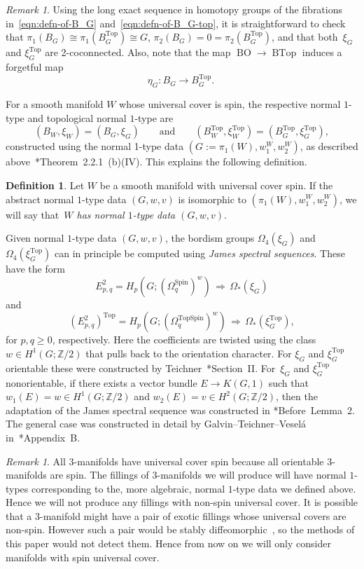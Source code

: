 \documentclass[a4paper, reqno]{amsart}
\theoremstyle{definition}
\newtheorem{definition}[proposition]{Definition}
\theoremstyle{remark}
\newtheorem{remark}[proposition]{Remark}
\renewcommand{\top}{\mathrm{Top}}
\newcommand{\Z}{\mathbb{Z}}
\newcommand{\Spin}{\mathrm{Spin}}
\DeclareMathOperator{\TopSpin}{TopSpin}
\DeclareMathOperator{\BTop}{BTop}
\newcommand{\Top}{\mathrm{Top}}
\DeclareMathOperator{\BO}{BO}
\begin{document}
\begin{remark}\label{remark:les-homotopy-groups}
       Using the long exact sequence in homotopy groups of the fibrations in~\eqref{eqn:defn-of-B_G} and~\eqref{eqn:defn-of-B_G-top}, it is straightforward to check that $\pi_1(B_G)\cong \pi_1(B^{\top}_G)\cong G$, $\pi_2(B_G) = 0 = \pi_2(B_G^{\top})$, and that both~$\xi_G$ and $\xi^{\top}_G$ are 2-coconnected. Also, note that the map $\BO\to \BTop$ induces a forgetful map 
    \[
    \eta_G\colon B_G\to B_G^{\top}.\
    \]
\end{remark}

For a smooth manifold $W$ whose universal cover is spin, the respective normal $1$-type and topological normal $1$-type are
\[
(B_W,\xi_W)=(B_G,\xi_G)\qquad\text{and}\qquad (B^{\top}_W,\xi^{\top}_W)=(B^{\top}_G,\xi^{\top}_G),
\]
constructed using the normal 1-type data $(G:=\pi_1(W), w_1^W, w_2^W)$, as described above~\cite{teichnerthesis}*{Theorem~2.2.1~(b)(IV)}. This explains the following definition.

\begin{definition}
    Let $W$ be a smooth manifold with universal cover spin. If the abstract normal $1$-type data $(G, w, v)$ is isomorphic to $(\pi_1(W), w_1^W, w_2^W)$, we will say that~\emph{$W$ has normal $1$-type data $(G, w, v)$}.
\end{definition}

Given normal $1$-type data $(G,w,v)$,
the bordism groups $\Omega_4(\xi_G)$ and $\Omega_4(\xi^{\Top}_G)$ can in principle be computed using \emph{James spectral sequences}.
These have the form  \[E^2_{p,q}=H_p(G;(\Omega_q^{\Spin})^w) \, \Rightarrow \, \Omega_*(\xi_G)\] and
\[(E^{2}_{p,q})^{\Top}=H_p(G;(\Omega_q^{\TopSpin})^w) \, \Rightarrow \, \Omega_*(\xi^{\Top}_G),\]
for $p,q \geq 0$, respectively. 
Here the coefficients are twisted using the class $w\in H^1(G;\Z/2)$ that pulls back to the orientation character.  
For $\xi_G$ and $\xi^{\Top}_G$ orientable these were constructed by Teichner~\cite{teichner-signature}*{Section~II}.
For~$\xi_G$ and $\xi^{\Top}_G$ nonorientable, 
if there exists a vector bundle $E \to K(G,1)$ such that $w_1(E) = w \in H^1(G;\Z/2)$ and $w_2(E) = v \in H^2(G;\Z/2)$, then the adaptation of the James spectral sequence was constructed in \cite{teichner-star}*{Before~Lemma~2}. 
The general case was constructed in detail by Galvin--Teichner--Vesel\'a in~\cite{GTV-xi-fillings}*{Appendix~B}.

\begin{remark}\label{rem:3manhave1type}
    All $3$-manifolds have universal cover spin because all orientable $3$-manifolds are spin. The fillings of $3$-manifolds we will produce will have normal $1$-types corresponding to the, more algebraic, normal $1$-type data we defined above. Hence we will not produce any fillings with non-spin universal cover.  It is possible that a $3$-manifold might have a pair of exotic fillings whose universal covers are non-spin. However such a pair would be stably diffeomorphic~,
    so the methods of this paper would not detect them. Hence from now on we will only consider manifolds with spin universal cover.
\end{remark}
\end{document}
